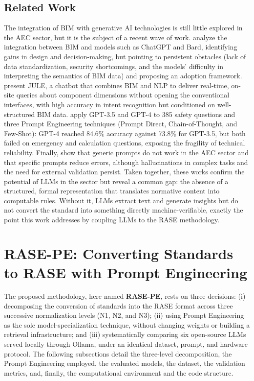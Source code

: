 \documentclass[a4paper,fleqn]{cas-sc}
\begin{document}
\subsection{Related Work}\label{sec:related-work}
The integration of BIM with generative AI technologies is still little explored in the AEC sector, but it is the subject of a recent wave of work. \citet{rane2023} analyze the integration between BIM and models such as ChatGPT and Bard, identifying gains in design and decision-making, but pointing to persistent obstacles (lack of data standardization, security shortcomings, and the models' difficulty in interpreting the semantics of BIM data) and proposing an adoption framework. \citet{lin2023} present JULE, a chatbot that combines BIM and NLP to deliver real-time, on-site queries about component dimensions without opening the conventional interfaces, with high accuracy in intent recognition but conditioned on well-structured BIM data. \citet{sammou2024} apply GPT-3.5 and GPT-4 to 385 safety questions and three Prompt Engineering techniques (Prompt Direct, Chain-of-Thought, and Few-Shot): GPT-4 reached 84.6\% accuracy against 73.8\% for GPT-3.5, but both failed on emergency and calculation questions, exposing the fragility of technical reliability. Finally, \citet{samsami2024} show that generic prompts do not work in the AEC sector and that specific prompts reduce errors, although hallucinations in complex tasks and the need for external validation persist. Taken together, these works confirm the potential of LLMs in the sector but reveal a common gap: the absence of a structured, formal representation that translates normative content into computable rules. Without it, LLMs extract text and generate insights but do not convert the standard into something directly machine-verifiable, exactly the point this work addresses by coupling LLMs to the RASE methodology.

\section{RASE-PE: Converting Standards to RASE with Prompt Engineering}\label{sec:methodology}
The proposed methodology, here named \textbf{RASE-PE}, rests on three decisions: (i) decomposing the conversion of standards into the RASE format across three successive normalization levels (N1, N2, and N3); (ii) using Prompt Engineering as the sole model-specialization technique, without changing weights or building a retrieval infrastructure; and (iii) systematically comparing six open-source LLMs served locally through Ollama, under an identical dataset, prompt, and hardware protocol. The following subsections detail the three-level decomposition, the Prompt Engineering employed, the evaluated models, the dataset, the validation metrics, and, finally, the computational environment and the code structure.
\end{document}
